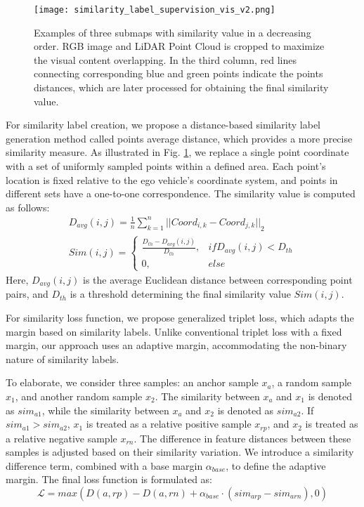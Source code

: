 \begin{figure}[]
    \centering
    \texttt{[image: similarity\_label\_supervision\_vis\_v2.png]}
    \caption{Examples of three submaps with similarity value in a decreasing order. RGB image and LiDAR Point Cloud is cropped to maximize the visual content overlapping. In the third column, red lines connecting corresponding blue and green points indicate the points distances, which are later processed for obtaining the final similarity value.}
    \label{fig:SimLabelSupVis}
\end{figure}
For similarity label creation, we propose a distance-based similarity label generation method called points average distance, which provides a more precise similarity measure. As illustrated in Fig. \ref{fig:SimLabelSupVis}, we replace a single point coordinate with a set of uniformly sampled points within a defined area. Each point's location is fixed relative to the ego vehicle's coordinate system, and points in different sets have a one-to-one correspondence. The similarity value is computed as follows:
\begin{equation}
\begin{gathered}
D_{avg}(i,j)={\frac{1}{n}}{\sum_{k=1}^{n}}{{||{Coord_{i,k}-Coord_{j,k}}||}_2} \\
{Sim(i,j)=
\begin{cases}
\frac{D_{th}-D_{avg}(i,j)}{D_{th}},& if D_{avg}(i,j)<{D_{th}} \\
0,& else
\end{cases}}
\end{gathered}
\end{equation}
\indent Here, $D_{avg}(i,j)$ is the average Euclidean distance between corresponding point pairs, and $D_{th}$ is a threshold determining the final similarity value $Sim(i,j)$.

For similarity loss function, we propose generalized triplet loss, which adapts the margin based on similarity labels. Unlike conventional triplet loss \cite{schroff2015facenet} with a fixed margin, our approach uses an adaptive margin, accommodating the non-binary nature of similarity labels.

To elaborate, we consider three samples: an anchor sample $x_a$, a random sample $x_1$, and another random sample $x_2$. The similarity between $x_a$ and $x_1$ is denoted as $sim_{a1}$, while the similarity between $x_a$ and $x_2$ is denoted as $sim_{a2}$. If $sim_{a1} > sim_{a2}$, $x_1$ is treated as a relative positive sample $x_{rp}$, and $x_2$ is treated as a relative negative sample $x_{rn}$. The difference in feature distances between these samples is adjusted based on their similarity variation. We introduce a similarity difference term, combined with a base margin ${\alpha}_{base}$, to define the adaptive margin. The final loss function is formulated as:
\begin{equation}
\mathcal{L}=max(D(a, rp)-D(a, rn)+{\alpha}_{base}\cdot{(sim_{arp}-sim_{arn})},0)
\end{equation}

